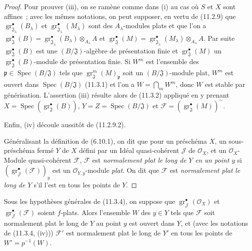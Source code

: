 \begin{proof}
Pour prouver (iii), on se ramène comme dans (i) au cas où $S$ et $X$ sont
affines~; avec les mêmes notations, on peut supposer, en vertu de (11.2.9) que
$\operatorname{gr}_{\mathfrak J_\lambda}^\bullet(B_\lambda)$ et
$\operatorname{gr}_{\mathfrak J_\lambda}^\bullet(M_\lambda)$ sont des
$A_\lambda$-modules plats et que l'on a
$\operatorname{gr}_{\mathfrak J}^\bullet(B)
=\operatorname{gr}_{\mathfrak J_\lambda}^\bullet(B_\lambda)\otimes_{A_\lambda}A$
et
$\operatorname{gr}_{\mathfrak J}^\bullet(M)
=\operatorname{gr}_{\mathfrak J_\lambda}^\bullet(M_\lambda)\otimes_{A_\lambda}A$.
Par suite $\operatorname{gr}_{\mathfrak J}^\bullet(B)$ est une
$(B/\mathfrak J)$-algèbre de présentation finie et
$\operatorname{gr}_{\mathfrak J}^\bullet(M)$ un
$\operatorname{gr}_{\mathfrak J}^\bullet(B)$-module de présentation finie. Si $W^m$
est l'ensemble des $\mathfrak p\in\operatorname{Spec}(B/\mathfrak J)$ tels que
$\operatorname{gr}_{\mathfrak J}^m(M)_\mathfrak p$ soit un
$(B/\mathfrak J)$-module plat, $W^m$ est ouvert dans
$\operatorname{Spec}(B/\mathfrak J)$ (11.3.1) et l'on a
$W=\bigcap_mW^m$, donc $W$ est stable par générisation. L'assertion (iii)
résulte alors de (11.3.2) appliqué en y prenant
$X=\operatorname{Spec}(\operatorname{gr}_{\mathfrak J}^\bullet(B))$,
$Y=Z=\operatorname{Spec}(B/\mathfrak J)$ et
$\mathcal F=(\operatorname{gr}_{\mathfrak J}^\bullet(M))^{\sim}$.

Enfin, (iv) découle aussitôt de (11.2.9.2).

Généralisant la définition de (6.10.1), on dit que pour un préschéma $X$, un
sous-préschéma fermé $Y$ de $X$ défini par un Idéal quasi-cohérent $\mathcal J$
de $\mathcal O_X$, et un $\mathcal O_X$-Module quasi-cohérent $\mathcal F$,
$\mathcal F$ est \emph{normalement plat le long de $Y$ en un point $y$} si
$(\operatorname{gr}_{\mathcal J}^\bullet(\mathcal F))_y$ est un
$\mathcal O_{Y,y}$-module \emph{plat}. On dit que $\mathcal F$ est
\emph{normalement plat le long de $Y$} s'il l'est en tous les points de $Y$.
\end{proof}

\begin{corollary}[11.3.5]
\label{IV.11.3.5-fr}
Sous les hypothèses générales de \textup{(11.3.4)}, on suppose que
$\operatorname{gr}_{\mathcal J}^\bullet(\mathcal O_X)$ et
$\operatorname{gr}_{\mathcal J}^\bullet(\mathcal F)$ soient $f$-plats. Alors
l'ensemble $W$ des $y\in Y$ tels que $\mathcal F$ soit normalement plat le long
de $Y$ au point $y$ est ouvert dans $Y$, et (avec les notations de
\textup{(11.3.4, (iv)))} $\mathcal F'$ est normalement plat le long de $Y'$ en tous les
points de $W'=p^{-1}(W)$.
\end{corollary}

